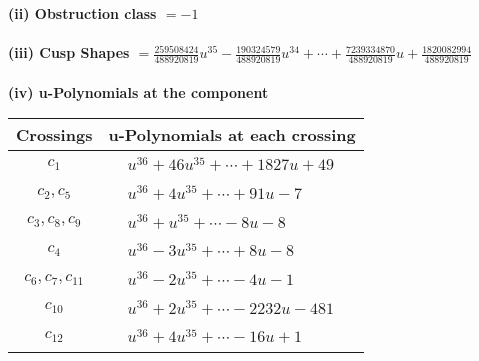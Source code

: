 \documentclass[1p]{elsarticle_modified}
\theoremstyle{definition}
\begin{document}
\flushleft \textbf{(ii) Obstruction class $= -1$}\\~\\
\flushleft \textbf{(iii) Cusp Shapes $= \frac{259508424}{488920819} u^{35}-\frac{190324579}{488920819} u^{34}+\cdots+\frac{7239334870}{488920819} u+\frac{1820082994}{488920819}$}\\~\\
\newpage\renewcommand{\arraystretch}{1}
\flushleft \textbf{(iv) u-Polynomials at the component}\newline \\
\begin{tabular}{m{50pt}|m{274pt}}
Crossings & \hspace{64pt}u-Polynomials at each crossing \\
\hline $$\begin{aligned}c_{1}\end{aligned}$$&$\begin{aligned}
&u^{36}+46 u^{35}+\cdots+1827 u+49
\end{aligned}$\\
\hline $$\begin{aligned}c_{2},c_{5}\end{aligned}$$&$\begin{aligned}
&u^{36}+4 u^{35}+\cdots+91 u-7
\end{aligned}$\\
\hline $$\begin{aligned}c_{3},c_{8},c_{9}\end{aligned}$$&$\begin{aligned}
&u^{36}+u^{35}+\cdots-8 u-8
\end{aligned}$\\
\hline $$\begin{aligned}c_{4}\end{aligned}$$&$\begin{aligned}
&u^{36}-3 u^{35}+\cdots+8 u-8
\end{aligned}$\\
\hline $$\begin{aligned}c_{6},c_{7},c_{11}\end{aligned}$$&$\begin{aligned}
&u^{36}-2 u^{35}+\cdots-4 u-1
\end{aligned}$\\
\hline $$\begin{aligned}c_{10}\end{aligned}$$&$\begin{aligned}
&u^{36}+2 u^{35}+\cdots-2232 u-481
\end{aligned}$\\
\hline $$\begin{aligned}c_{12}\end{aligned}$$&$\begin{aligned}
&u^{36}+4 u^{35}+\cdots-16 u+1
\end{aligned}$\\
\hline
\end{tabular}\\~\\
\end{document}

